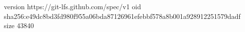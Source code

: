 version https://git-lfs.github.com/spec/v1
oid sha256:e49dc8bd3fd980f955a06bda87126961efebbf578a8b001a928912251579dadf
size 43840
